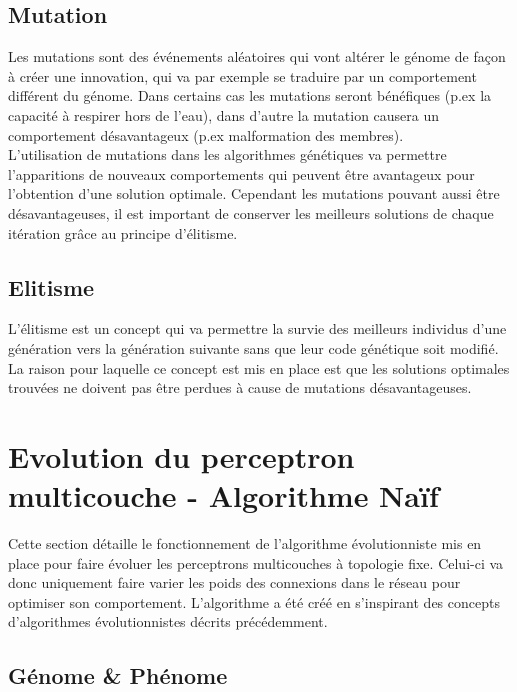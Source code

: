 \documentclass{article}
\begin{document}
\subsection{Mutation}

Les mutations sont des événements aléatoires qui vont altérer le génome de façon à créer une innovation, qui va par exemple se traduire par un comportement différent du génome. Dans certains cas les mutations seront bénéfiques (p.ex la capacité à respirer hors de l'eau), dans d'autre la mutation causera un comportement désavantageux (p.ex malformation des membres)\cite{wikimutation}.\\

L'utilisation de mutations dans les algorithmes génétiques va permettre l'apparitions de nouveaux comportements qui peuvent être avantageux pour l'obtention d'une solution optimale. Cependant les mutations pouvant aussi être désavantageuses, il est important de conserver les meilleurs solutions de chaque itération grâce au principe d'élitisme.

\subsection{Elitisme}

L'élitisme est un concept qui va permettre la survie des meilleurs individus d'une génération vers la génération suivante sans que leur code génétique soit modifié\cite{elitism}.\\
La raison pour laquelle ce concept est mis en place est que les solutions optimales trouvées ne doivent pas être perdues à cause de mutations désavantageuses.

\newpage
\section{Evolution du perceptron multicouche - Algorithme Naïf}

Cette section détaille le fonctionnement de l'algorithme évolutionniste mis en place pour faire évoluer les perceptrons multicouches à topologie fixe. Celui-ci va donc uniquement faire varier les poids des connexions dans le réseau pour optimiser son comportement. L'algorithme a été créé en s'inspirant des concepts d'algorithmes évolutionnistes décrits précédemment.

\subsection{Génome \& Phénome}
\end{document}
